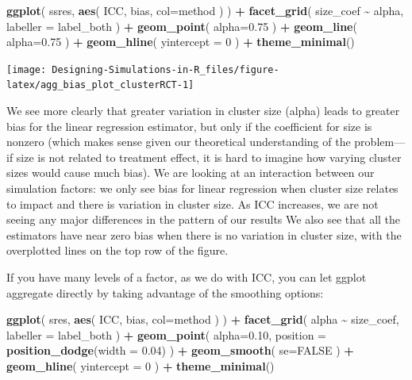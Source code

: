 \documentclass[
]{book}
\newenvironment{Shaded}{\begin{snugshade}}{\end{snugshade}}
\newcommand{\AttributeTok}[1]{\textcolor[rgb]{0.13,0.29,0.53}{#1}}
\newcommand{\ConstantTok}[1]{\textcolor[rgb]{0.56,0.35,0.01}{#1}}
\newcommand{\DecValTok}[1]{\textcolor[rgb]{0.00,0.00,0.81}{#1}}
\newcommand{\FloatTok}[1]{\textcolor[rgb]{0.00,0.00,0.81}{#1}}
\newcommand{\FunctionTok}[1]{\textcolor[rgb]{0.13,0.29,0.53}{\textbf{#1}}}
\newcommand{\NormalTok}[1]{#1}
\newcommand{\SpecialCharTok}[1]{\textcolor[rgb]{0.81,0.36,0.00}{\textbf{#1}}}
\begin{document}
\begin{Shaded}
\begin{Highlighting}[]
\FunctionTok{ggplot}\NormalTok{( ssres, }\FunctionTok{aes}\NormalTok{( ICC, bias, }\AttributeTok{col=}\NormalTok{method ) ) }\SpecialCharTok{+}
  \FunctionTok{facet\_grid}\NormalTok{( size\_coef }\SpecialCharTok{\textasciitilde{}}\NormalTok{  alpha, }\AttributeTok{labeller =}\NormalTok{ label\_both ) }\SpecialCharTok{+}
  \FunctionTok{geom\_point}\NormalTok{( }\AttributeTok{alpha=}\FloatTok{0.75}\NormalTok{ ) }\SpecialCharTok{+} 
  \FunctionTok{geom\_line}\NormalTok{( }\AttributeTok{alpha=}\FloatTok{0.75}\NormalTok{ ) }\SpecialCharTok{+}
  \FunctionTok{geom\_hline}\NormalTok{( }\AttributeTok{yintercept =} \DecValTok{0}\NormalTok{ ) }\SpecialCharTok{+}
  \FunctionTok{theme\_minimal}\NormalTok{()}
\end{Highlighting}
\end{Shaded}

\begin{center}\texttt{[image: Designing-Simulations-in-R\_files/figure-latex/agg\_bias\_plot\_clusterRCT-1]} \end{center}

We see more clearly that greater variation in cluster size (alpha) leads to greater bias for the linear regression estimator, but only if the coefficient for size is nonzero (which makes sense given our theoretical understanding of the problem---if size is not related to treatment effect, it is hard to imagine how varying cluster sizes would cause much bias).
We are looking at an interaction between our simulation factors: we only see bias for linear regression when cluster size relates to impact and there is variation in cluster size.
As ICC increases, we are not seeing any major differences in the pattern of our results
We also see that all the estimators have near zero bias when there is no variation in cluster size, with the overplotted lines on the top row of the figure.

If you have many levels of a factor, as we do with ICC, you can let ggplot aggregate directly by taking advantage of the smoothing options:

\begin{Shaded}
\begin{Highlighting}[]
\FunctionTok{ggplot}\NormalTok{( sres, }\FunctionTok{aes}\NormalTok{( ICC, bias, }\AttributeTok{col=}\NormalTok{method ) ) }\SpecialCharTok{+}
  \FunctionTok{facet\_grid}\NormalTok{( alpha }\SpecialCharTok{\textasciitilde{}}\NormalTok{  size\_coef, }\AttributeTok{labeller =}\NormalTok{ label\_both ) }\SpecialCharTok{+}
  \FunctionTok{geom\_point}\NormalTok{( }\AttributeTok{alpha=}\FloatTok{0.10}\NormalTok{,}
              \AttributeTok{position =} \FunctionTok{position\_dodge}\NormalTok{(}\AttributeTok{width =} \FloatTok{0.04}\NormalTok{) ) }\SpecialCharTok{+}
  \FunctionTok{geom\_smooth}\NormalTok{( }\AttributeTok{se=}\ConstantTok{FALSE}\NormalTok{ ) }\SpecialCharTok{+} 
  \FunctionTok{geom\_hline}\NormalTok{( }\AttributeTok{yintercept =} \DecValTok{0}\NormalTok{ ) }\SpecialCharTok{+}
  \FunctionTok{theme\_minimal}\NormalTok{()}
\end{Highlighting}
\end{Shaded}
\end{document}
